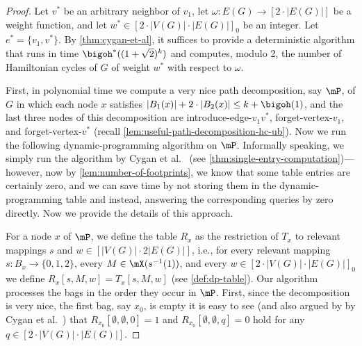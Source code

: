 \documentclass[a4paper,UKenglish,cleveref, autoref, thm-restate]{lipics-v2021}
\begin{document}
\begin{proof}
	Let $v^*$ be an arbitrary neighbor of $v_1$, let $\omega \colon E(G) \to [2\cdot|E(G)|]$ be a weight function, and let $w^* \in [2 \cdot |V(G)| \cdot |E(G)|]_0$ be an integer.
	Let $e^* = \{v_1, v^*\}$.
	By \cref{thm:cygan-et-al}, it suffices to provide a deterministic algorithm that runs in time $\bigoh^*((1+\sqrt{2})^k)$ and computes, modulo 2, the number of Hamiltonian cycles of $G$ of weight $w^*$ with respect to $\omega$.
	
	First, in polynomial time we compute a very nice path decomposition, say $\mP$, of $G$ in which each node $x$ satisfies $|B_1(x)| + 2 \cdot |B_2(x)| \leq k + \bigoh(1)$, and the last three nodes of this decomposition are introduce-edge-$v_1 v^*$, forget-vertex-$v_1$, and forget-vertex-$v^*$ (recall \cref{lem:useful-path-decomposition-hc-ub}).
	Now we run the following dynamic-programming algorithm on $\mP$. 
	Informally speaking, we simply run the algorithm by Cygan et al.~\cite{DBLP:journals/jacm/CyganKN18} (see \cref{thm:single-entry-computation})---however, now by \cref{lem:number-of-footprints}, we know that some table entries are certainly zero, and we can save time by not storing them in the dynamic-programming table and instead, answering the corresponding queries by zero directly.
	Now we provide the details of this approach.
	
	For a node $x$ of $\mP$, we define the table $R_x$ as the restriction of $T_x$ to relevant mappings $s$ and $w \in [|V(G)| \cdot 2 |E(G)|]$, i.e., for every relevant mapping $s \colon B_x \to \{0, 1, 2\}$, every $M \in \mX(s^{-1}(1))$, and every $w \in [2 \cdot |V(G)| \cdot |E(G)|]_0$ we define $R_x[s, M, w] = T_x[s, M, w]$ (see \cref{def:dp-table}).
	Our algorithm processes the bags in the order they occur in $\mP$. 
	First, since the decomposition is very nice, the first bag, say $x_0$, is empty it is easy to see (and also argued by by Cygan et al.~\cite{DBLP:journals/jacm/CyganKN18}) that 
	$R_{x_0}[\emptyset, \emptyset, 0] = 1$
	and
	$R_{x_0}[\emptyset, \emptyset, q] = 0$
	hold for any $q \in [2 \cdot |V(G)| \cdot |E(G)|]$.
	

\end{proof}
\end{document}
